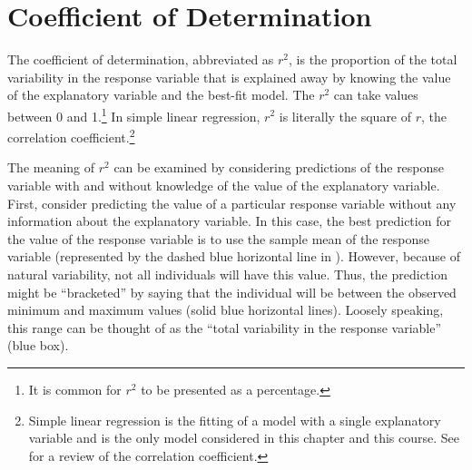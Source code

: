 \documentclass[10pt,openany]{book}\usepackage[]{graphicx}\usepackage[]{color}
\begin{document}

\section{Coefficient of Determination}
\vspace{-12pt}
The coefficient of determination, abbreviated as $r^{2}$, is the proportion of the total variability in the response variable that is explained away by knowing the value of the explanatory variable and the best-fit model.  The $r^{2}$ can take values between 0 and 1.\footnote{It is common for $r^{2}$ to be presented as a percentage.}  In simple linear regression, $r^{2}$ is literally the square of $r$, the correlation coefficient.\footnote{Simple linear regression is the fitting of a model with a single explanatory variable and is the only model considered in this chapter and this course. See  for a review of the correlation coefficient.}


\vspace{-12pt}

The meaning of $r^{2}$ can be examined by considering predictions of the response variable with and without knowledge of the value of the explanatory variable.  First, consider predicting the value of a particular response variable without any information about the explanatory variable.  In this case, the best prediction for the value of the response variable is to use the sample mean of the response variable (represented by the dashed blue horizontal line in ).  However, because of natural variability, not all individuals will have this value.  Thus, the prediction might be ``bracketed'' by saying that the individual will be between the observed minimum and maximum values (solid blue horizontal lines).  Loosely speaking, this range can be thought of as the ``total variability in the response variable'' (blue box).
\end{document}
